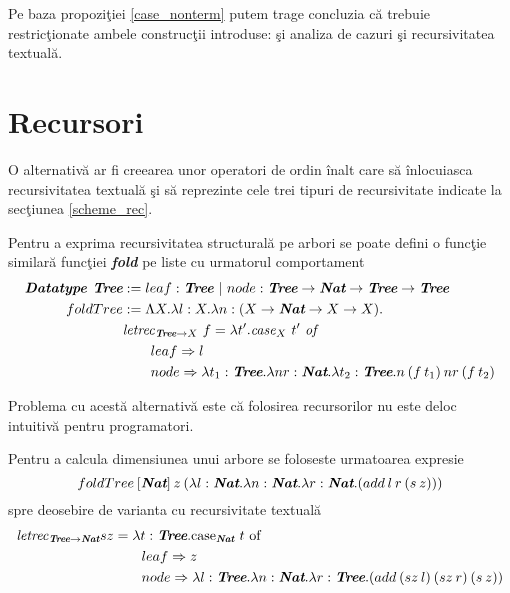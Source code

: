 Pe baza propozi\c tiei \ref{case_nonterm} putem trage concluzia c\u a trebuie restric\c tionate ambele construc\c tii introduse: \c si analiza de cazuri \c si recursivitatea textual\u a.

\section{Recursori}

O alternativ\u a ar fi creearea unor operatori de ordin \^ inalt care s\u a \^ inlocuiasca recursivitatea textual\u a \c si s\u a reprezinte cele trei tipuri de recursivitate indicate la sec\c tiunea \ref{scheme_rec}.

\begin{example}
Pentru a exprima recursivitatea structural\u a pe arbori se poate defini o func\c tie similar\u a func\c tiei \emph{\textbf{fold}} pe liste cu urmatorul comportament
\begin{align*}
\textbf{\emph{Datatype}  } \emph{\textbf{Tree}} &:= leaf : \emph{\textbf{Tree}} \ |\  node : \emph{\textbf{Tree}} \to \emph{\textbf{Nat}} \to \emph{\textbf{Tree}} \to \emph{\textbf{Tree}} \\
foldTree &:= \Lambda X .\lambda l:X. \lambda n : (X\to \emph{\textbf{Nat}} \to X \to X). \\
 &\text{\emph{letrec}}_{\emph{\textbf{Tree}} \to X}\ f =  \lambda t'. \text{\emph{case}}_X \ t' \text{ \emph{of} }\\
 &\qquad leaf \Rightarrow l\\
 &\qquad node \Rightarrow \lambda t_1 : \emph{\textbf{Tree}}.\lambda nr :\emph{\textbf{Nat}}. \lambda t_2 : \emph{\textbf{Tree}} . n\hspace{2pt} (f\hspace{2pt} t_1)\hspace{2pt} nr\hspace{2pt} (f\hspace{2pt} t_2)
\end{align*}
\end{example}

Problema cu acest\u a alternativ\u a este c\u a folosirea recursorilor nu este deloc intuitiv\u a pentru programatori.
\begin{example}
Pentru a calcula dimensiunea unui arbore se foloseste urmatoarea expresie
$$foldTree \hspace{2pt} [\emph{\textbf{Nat}}]\hspace{2pt} z \hspace{2pt}  (\lambda l : \emph{\textbf{Nat}}.\lambda  n : \emph{\textbf{Nat}}.\lambda r :\emph{\textbf{Nat}} . (add\hspace{2pt} l\hspace{2pt} r\hspace{2pt} (s\hspace{2pt} z))) $$
spre deosebire de varianta cu recursivitate textual\u a
\begin{align*}
\text{\emph{letrec}}_{\emph{\textbf{Tree}} \to \emph{\textbf{Nat}}} sz &= \lambda t  :\emph{\textbf{Tree}}.  \text{case}_{\emph{\textbf{Nat}}}\ t \text{ of } \\
&\qquad leaf \Rightarrow z \\
&\qquad node \Rightarrow \lambda l :\emph{\textbf{Tree}} .\lambda n: \emph{\textbf{Nat}}.\lambda r : \emph{\textbf{Tree}}. (add\hspace{2pt} (sz\hspace{2pt} l) \hspace{2pt} (sz \hspace{2pt} r)\hspace{2pt} (s\hspace{2pt} z))
\end{align*}
\end{example}

